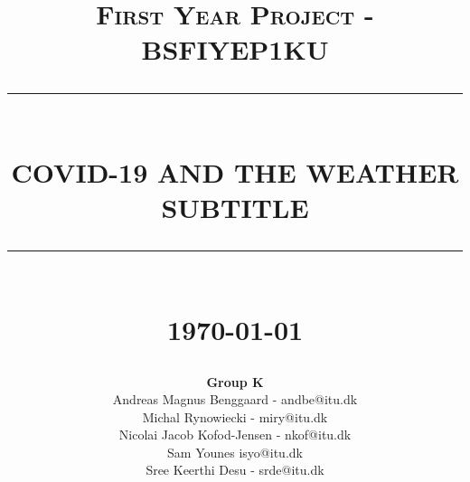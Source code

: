 \documentclass[11pt]{article}
\newcommand{\HRule}[1]{\rule{\linewidth}{#1}}
\begin{document}
% 
\title{ \normalsize \textsc{First Year Project - BSFIYEP1KU}
		\\ [2.0cm]
		\HRule{0.5pt} \\
		\LARGE \textbf{\uppercase{COVID-19 and the Weather}\\
		\normalsize{\textsc{SUBTITLE}}}
		\HRule{2pt} \\ [0.5cm]
		\normalsize \today \vspace*{5\baselineskip}}

\date{}

\author{
		\textbf{Group K} \\ 
		Andreas Magnus Benggaard - andbe@itu.dk\\ 
		Michal Rynowiecki - miry@itu.dk\\ 
		Nicolai Jacob Kofod-Jensen - nkof@itu.dk\\ 
		Sam Younes isyo@itu.dk \\ 
		Sree Keerthi Desu - srde@itu.dk}

\maketitle
\newpage

\tableofcontents
\newpage

\sectionfont{\scshape}












\newpage
{}

\end{document}
